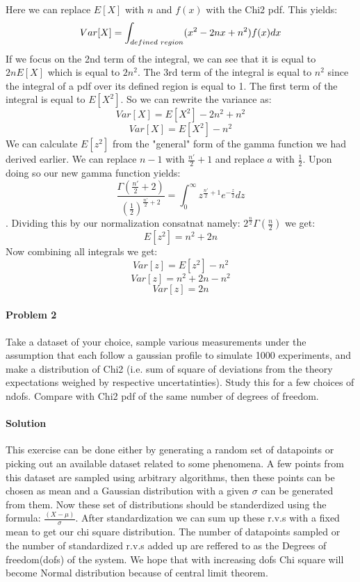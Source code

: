\documentclass[12pt, letterpaper]{article}
\begin{document}
Here we can replace $E[X]$ with $n$ and $f(x)$ with the Chi2 pdf. This yields:
\[ Var[X]=\int_{defined \hspace{1mm} region}^{} (x^{2} -2nx + n^2) f(x) dx \]
If we focus on the 2nd term of the integral, we can see that it is equal to $2nE[X]$ which is equal to $2n^2$. The 3rd term of the integral is equal to $n^2$ since the integral of a pdf over its defined region is equal to 1. The first term of the integral is equal to $E[X^2]$. So we can rewrite the variance as:
\[ Var[X] = E[X^2] - 2n^2 + n^2 \]
\[ Var[X] = E[X^2] - n^2 \]
We can calculate $E[z^2]$ from the "general" form of the gamma function we had derived earlier. We can replace $n-1$ with $\frac{n'}{2}+1$ and replace $a$ with $\frac{1}{2}$. Upon doing so our new gamma function yields:
\[ \frac{\Gamma(\frac{n'}{2}+2)}{\left(\frac{1}{2}\right)^{\frac{n'}{2}+2}} = \int_0^\infty z^{\frac{n'}{2}+1} e^{-\frac{z}{2}} dz \]. Dividing  this by our normalization consatnat namely: $2^{\frac{n}{2}} \Gamma\left(\frac{n}{2}\right)$ we get:
\[ E[z^2]= n^2+2n \] 
Now combining all integrals we get:
\[ Var[z] = E[z^2] - n^2 \]
\[ Var[z] = n^2+2n - n^2 \]
\[ Var[z] = 2n \]

\paragraph{Problem 2}
Take a dataset of your choice, sample various measurements under the assumption that each follow a gaussian profile to simulate 1000 experiments, and make a distribution of Chi2 (i.e. sum of square of deviations from the theory expectations weighed by respective uncertatinties). Study this for a few choices of ndofs.  Compare with Chi2 pdf of the same number of degrees of freedom.
\paragraph{Solution}
This exercise can be done either by generating a random set of datapoints or picking out an available dataset related to some phenomena. A few points from this dataset are sampled using
arbitrary algorithms, then these points can be chosen as mean and a Gaussian distribution with a given $\sigma$ can be generated from them. Now these set of distributions should be standerdized using the formula: $\frac{(X-\mu)}{\sigma}$.
After standardization we can sum up these r.v.s with a fixed mean to get our chi square distribution. The number of datapoints sampled or the number of standardized r.v.s added up are reffered to as the Degrees of freedom(dofs) of the system.
We hope that with increasing dofs Chi square will become Normal distribution because of central limit theorem.
\end{document}
